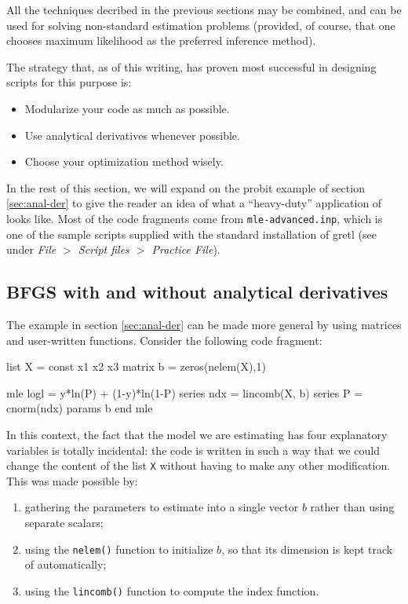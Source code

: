 All the techniques decribed in the previous sections may be combined,
and  can be used for solving non-standard estimation problems
(provided, of course, that one chooses maximum likelihood as the
preferred inference method).

The strategy that, as of this writing, has proven most successful in
designing scripts for this purpose is:
\begin{itemize}
\item Modularize your code as much as possible.
\item Use analytical derivatives whenever possible.
\item Choose your optimization method wisely.
\end{itemize}

In the rest of this section, we will expand on the probit example of
section \ref{sec:anal-der} to give the reader an idea of what a
``heavy-duty'' application of  looks like. Most of the code
fragments come from \verb|mle-advanced.inp|, which is one of the
sample scripts supplied with the standard installation of gretl
(see under \emph{File $>$ Script files $>$ Practice File}).

\subsection{BFGS with and without analytical derivatives}
\label{sec:mle-adv-bfgs}

The example in section \ref{sec:anal-der} can be made more general by
using matrices and user-written functions. Consider the following code
fragment:
\begin{code}
list X = const x1 x2 x3
matrix b = zeros(nelem(X),1)

mle logl = y*ln(P) + (1-y)*ln(1-P)
    series ndx = lincomb(X, b)
    series P = cnorm(ndx)
    params b
end mle
\end{code}

In this context, the fact that the model we are estimating has four
explanatory variables is totally incidental: the code is written in
such a way that we could change the content of the list \texttt{X}
without having to make any other modification. This was made possible
by:
\begin{enumerate}
\item gathering the parameters to estimate into a single vector $b$
  rather than using separate scalars;
\item using the \texttt{nelem()} function to initialize $b$, so that
  its dimension is kept track of automatically;
\item using the \texttt{lincomb()} function to compute the index
  function.
\end{enumerate}

